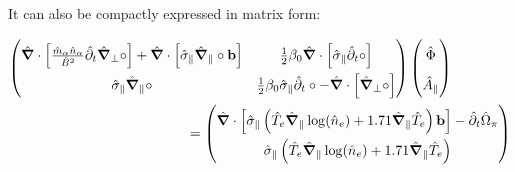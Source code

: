 It can also be compactly expressed in matrix form: 

\begin{align}
	\renewcommand\arraystretch{1.8}
	\begin{pmatrix}
		\hat{\grad}\cdot\left[\frac{\hat{m}_\alpha \hat{n}_\alpha}{ \hat{B}^2}\hat{\partial}_t\hat{\grad}_\perp\circ\right] +  \hat{\grad}\cdot\left[\hat{\sigma}_\parallel\hat{\grad}_\parallel\circ\mathbf{b}\right] & 
		\frac{1}{2}\beta_0\hat{\grad}\cdot\left[\hat{\sigma}_\parallel\hat{\partial}_t\circ\right]
		\\
		\hat{\sigma}_\parallel\hat{\grad}_\parallel\circ & 
		\frac{1}{2}\beta_0\hat{\sigma}_\parallel\hat{\partial}_t\circ-\hat{\grad}\cdot\left[\hat{\grad}_\perp\circ\right]
	\end{pmatrix}
	\begin{pmatrix}
		\hat{\Phi} \\ \hat{A}_\parallel
	\end{pmatrix} 
	\hspace{1.5cm}\nonumber \\ \label{eq:vorticityEquation_electromagnetic_dedimensionalized_matrix}\hspace{1.5cm}
	= 
	\begin{pmatrix}
		\hat{\grad}\cdot\left[\hat{\sigma}_\parallel\left(
		\hat{T}_e\hat{\grad}_\parallel\log(\hat{n}_e) + 1.71\hat{\grad}_\parallel \hat{T}_e
		\right)\mathbf{b}\right]-\hat{\partial}_t \hat{\Omega}_\pi \\
		\hat{\sigma}_\parallel\left(
		\hat{T}_e\hat{\grad}_\parallel\log(\hat{n}_e) + 1.71\hat{\grad}_\parallel \hat{T}_e
		\right)
	\end{pmatrix}
\end{align}



